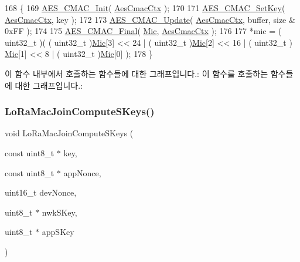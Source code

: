 \begin{DoxyCode}
168 \{
169     \mbox{\hyperlink{cmac_8c_a0344ba56e27c8029332069892af08737}{AES\_CMAC\_Init}}( \mbox{\hyperlink{_lo_ra_mac_crypto_8c_a25127fdfb4e4a4118cd89fa3af0f785f}{AesCmacCtx}} );
170 
171     \mbox{\hyperlink{cmac_8c_a0cbe43f8858ba5fbf5bbd5f03e362170}{AES\_CMAC\_SetKey}}( \mbox{\hyperlink{_lo_ra_mac_crypto_8c_a25127fdfb4e4a4118cd89fa3af0f785f}{AesCmacCtx}}, key );
172 
173     \mbox{\hyperlink{cmac_8c_ad1be03bf3df1635dd5cbf8943f4d04f6}{AES\_CMAC\_Update}}( \mbox{\hyperlink{_lo_ra_mac_crypto_8c_a25127fdfb4e4a4118cd89fa3af0f785f}{AesCmacCtx}}, buffer, size & 0xFF );
174 
175     \mbox{\hyperlink{cmac_8c_a8ea4da33d50984199d8a91bc0ab86b15}{AES\_CMAC\_Final}}( \mbox{\hyperlink{_lo_ra_mac_crypto_8c_a61e2b75611626e7360cc4f138d172192}{Mic}}, \mbox{\hyperlink{_lo_ra_mac_crypto_8c_a25127fdfb4e4a4118cd89fa3af0f785f}{AesCmacCtx}} );
176 
177     *mic = ( uint32\_t )( ( uint32\_t )\mbox{\hyperlink{_lo_ra_mac_crypto_8c_a61e2b75611626e7360cc4f138d172192}{Mic}}[3] << 24 | ( uint32\_t )\mbox{\hyperlink{_lo_ra_mac_crypto_8c_a61e2b75611626e7360cc4f138d172192}{Mic}}[2] << 16 | ( uint32\_t )
      \mbox{\hyperlink{_lo_ra_mac_crypto_8c_a61e2b75611626e7360cc4f138d172192}{Mic}}[1] << 8 | ( uint32\_t )\mbox{\hyperlink{_lo_ra_mac_crypto_8c_a61e2b75611626e7360cc4f138d172192}{Mic}}[0] );
178 \}
\end{DoxyCode}
이 함수 내부에서 호출하는 함수들에 대한 그래프입니다.\+:
이 함수를 호출하는 함수들에 대한 그래프입니다.\+:
\mbox{\label{group___l_o_r_a_m_a_c___c_r_y_p_t_o_gad6fc2ace27fa388ec860fc2e5ae1f544}} 
\subsubsection{\texorpdfstring{Lo\+Ra\+Mac\+Join\+Compute\+S\+Keys()}{LoRaMacJoinComputeSKeys()}}
{\footnotesize\ttfamily void Lo\+Ra\+Mac\+Join\+Compute\+S\+Keys (\begin{DoxyParamCaption}\item[{const uint8\+\_\+t $\ast$}]{key,  }\item[{const uint8\+\_\+t $\ast$}]{app\+Nonce,  }\item[{uint16\+\_\+t}]{dev\+Nonce,  }\item[{uint8\+\_\+t $\ast$}]{nwk\+S\+Key,  }\item[{uint8\+\_\+t $\ast$}]{app\+S\+Key }\end{DoxyParamCaption})}

